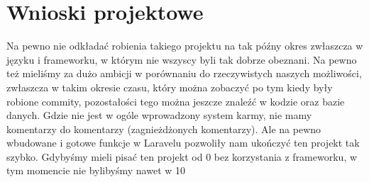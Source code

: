\documentclass{article}
\begin{document}
\section{Wnioski projektowe}
Na pewno nie odkładać robienia takiego projektu na tak późny okres zwłaszcza w języku i frameworku, w którym nie wszyscy byli tak dobrze obeznani.
Na pewno też mieliśmy za dużo ambicji w porównaniu do rzeczywistych naszych możliwości, zwłaszcza w takim okresie czasu, który można zobaczyć po tym kiedy były robione commity, pozostałości tego można jeszcze znaleźć w kodzie oraz bazie danych. Gdzie nie jest w ogóle wprowadzony system karmy, nie mamy komentarzy do komentarzy (zagnieżdżonych komentarzy).
Ale na pewno wbudowane i gotowe funkcje w Laravelu pozwoliły nam ukończyć ten projekt tak szybko. Gdybyśmy mieli pisać ten projekt od 0 bez korzystania z frameworku, w tym momencie nie bylibyśmy nawet w 10%
\end{document}
